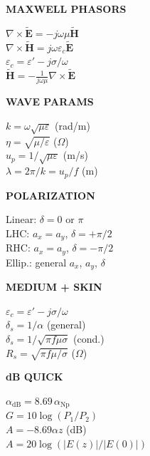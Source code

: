\documentclass[6pt,letterpaper]{article}
\newcommand{\shead}[3]{%
  \noindent\colorbox{#1}{\parbox{\dimexpr\linewidth-2\fboxsep\relax}%
  {\color{#2}\bfseries\fontsize{6}{7}\selectfont #3}}\vspace{0.5pt}}
\begin{document}
\vfill
\noindent
\begin{minipage}[t]{0.19\linewidth}
\shead{bluebg}{blue}{MAXWELL PHASORS}
\begin{ebox}
$\nabla\!\times\!\tilde{\mathbf{E}}=-j\omega\mu\tilde{\mathbf{H}}$\\
$\nabla\!\times\!\tilde{\mathbf{H}}=j\omega\varepsilon_c\tilde{\mathbf{E}}$\\
$\varepsilon_c=\varepsilon'-j\sigma/\omega$\\
$\tilde{\mathbf{H}}=-\frac{1}{j\omega\mu}\nabla\!\times\!\tilde{\mathbf{E}}$
\end{ebox}
\end{minipage}\hfill
\begin{minipage}[t]{0.19\linewidth}
\shead{purplebg}{purple}{WAVE PARAMS}
\begin{ebox}
$k=\omega\sqrt{\mu\varepsilon}$ (rad/m)\\
$\eta=\sqrt{\mu/\varepsilon}$ ($\Omega$)\\
$u_p=1/\sqrt{\mu\varepsilon}$ (m/s)\\
$\lambda=2\pi/k=u_p/f$ (m)
\end{ebox}
\end{minipage}\hfill
\begin{minipage}[t]{0.19\linewidth}
\shead{tealbg}{teal}{POLARIZATION}
\begin{ebox}
Linear: $\delta=0$ or $\pi$\\
LHC: $a_x=a_y$, $\delta=+\pi/2$\\
RHC: $a_x=a_y$, $\delta=-\pi/2$\\
Ellip.: general $a_x$, $a_y$, $\delta$
\end{ebox}
\end{minipage}\hfill
\begin{minipage}[t]{0.19\linewidth}
\shead{coralbg}{coral}{MEDIUM + SKIN}
\begin{ebox}
$\varepsilon_c=\varepsilon'-j\sigma/\omega$\\
$\delta_s=1/\alpha$ (general)\\
$\delta_s=1/\sqrt{\pi f\mu\sigma}$ (cond.)\\
$R_s=\sqrt{\pi f\mu/\sigma}$ ($\Omega$)
\end{ebox}
\end{minipage}\hfill
\begin{minipage}[t]{0.19\linewidth}
\shead{graybg}{gray}{dB QUICK}
\begin{ebox}
$\alpha_\text{dB}=8.69\,\alpha_\text{Np}$\\
$G=10\log(P_1/P_2)$\\
$A=-8.69\alpha z$ (dB)\\
$A=20\log(|E(z)|/|E(0)|)$
\end{ebox}
\end{minipage}
\end{document}
